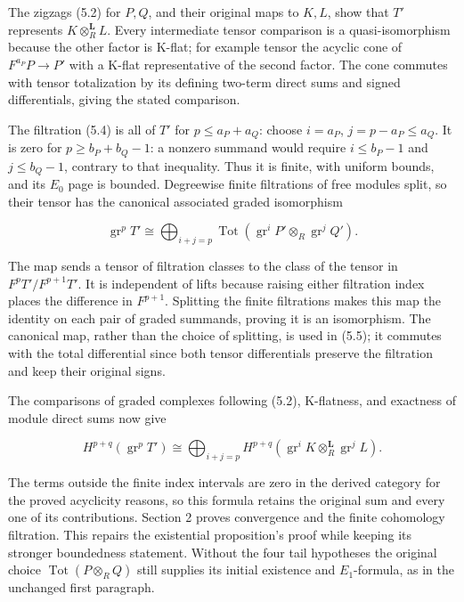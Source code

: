 \documentclass[11pt]{article}
\begin{document}
The zigzags (5.2) for \(P,Q\), and their original maps to \(K,L\), show that \(T'\) represents \(K\otimes_R^{\mathbf L}L\). Every intermediate tensor comparison is a quasi-isomorphism because the other factor is K-flat; for example tensor the acyclic cone of \(F^{a_P}P\to P'\) with a K-flat representative of the second factor. The cone commutes with tensor totalization by its defining two-term direct sums and signed differentials, giving the stated comparison.

The filtration (5.4) is all of \(T'\) for \(p\leq a_P+a_Q\): choose \(i=a_P\), \(j=p-a_P\leq a_Q\). It is zero for \(p\geq b_P+b_Q-1\): a nonzero summand would require \(i\leq b_P-1\) and \(j\leq b_Q-1\), contrary to that inequality. Thus it is finite, with uniform bounds, and its \(E_0\) page is bounded. Degreewise finite filtrations of free modules split, so their tensor has the canonical associated graded isomorphism

\[
\operatorname{gr}^pT'
\cong\bigoplus_{i+j=p}\operatorname{Tot}
  (\operatorname{gr}^iP'\otimes_R\operatorname{gr}^jQ').       \tag{5.5}
\]

The map sends a tensor of filtration classes to the class of the tensor in \(F^pT'/F^{p+1}T'\). It is independent of lifts because raising either filtration index places the difference in \(F^{p+1}\). Splitting the finite filtrations makes this map the identity on each pair of graded summands, proving it is an isomorphism. The canonical map, rather than the choice of splitting, is used in (5.5); it commutes with the total differential since both tensor differentials preserve the filtration and keep their original signs.

The comparisons of graded complexes following (5.2), K-flatness, and exactness of module direct sums now give

\[
H^{p+q}(\operatorname{gr}^pT')
\cong\bigoplus_{i+j=p}
H^{p+q}(\operatorname{gr}^iK\otimes_R^{\mathbf L}\operatorname{gr}^jL).
\]

The terms outside the finite index intervals are zero in the derived category for the proved acyclicity reasons, so this formula retains the original sum and every one of its contributions. Section 2 proves convergence and the finite cohomology filtration. This repairs the existential proposition's proof while keeping its stronger boundedness statement. Without the four tail hypotheses the original choice \(\operatorname{Tot}(P\otimes_R Q)\) still supplies its initial existence and \(E_1\)-formula, as in the unchanged first paragraph.
\end{document}
